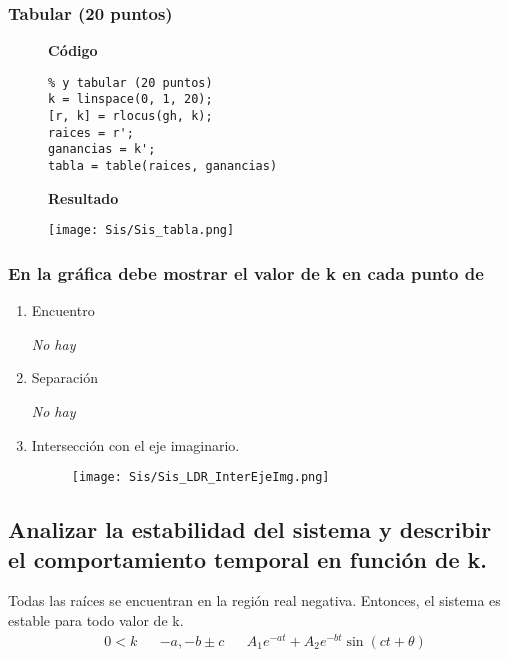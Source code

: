 \subsubsection{Tabular (20 puntos)}
\begin{figure}[H]
    \begin{framed}
        \centering
        \begin{minipage}[t]{.35\textwidth}
            \textbf{Código}
            \begin{verbatim}
% y tabular (20 puntos)
k = linspace(0, 1, 20);
[r, k] = rlocus(gh, k);
raices = r';
ganancias = k';
tabla = table(raices, ganancias)
            \end{verbatim}
        \end{minipage}
        \quad
        \begin{minipage}[t]{.55\textwidth}
            \textbf{Resultado}
            
            \texttt{[image: Sis/Sis\_tabla.png]}
        \end{minipage}
    \end{framed}
\end{figure}

\subsubsection{En la gráfica debe mostrar el valor de k en cada punto de}
\begin{enumerate}
    \item Encuentro

    {\it No hay}
    
    \item Separación

    {\it No hay}
    \newpage
    
    \item Intersección con el eje imaginario.
    \begin{figure}[H]
        \centering
        \begin{framed}
            \texttt{[image: Sis/Sis\_LDR\_InterEjeImg.png]}
        \end{framed}
    \end{figure}
\end{enumerate}

\subsection{Analizar la estabilidad del sistema y describir el comportamiento temporal en función de k.}
Todas las raíces se encuentran en la región real negativa. Entonces, el sistema es estable para todo valor de k.
\begin{align*}
    &0<k && -a,-b\pm c &&A_1e^{-at} + A_2e^{-bt}\sin{(ct+\theta)}
\end{align*}

